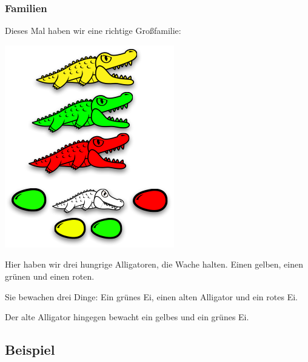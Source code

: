 \documentclass{beamer}
\begin{document}

\begin{frame}
\frametitle{Familien}

Dieses Mal haben wir eine richtige Großfamilie:\pause

\begin{multicols}{2}

\begin{center}
\includegraphics[scale=0.5]{families_3.png} 
\end{center}

\columnbreak
\pause

Hier haben wir drei hungrige Alligatoren, die Wache halten. Einen gelben, einen grünen und einen roten.\pause\bigskip

Sie bewachen drei Dinge: Ein grünes Ei, einen alten Alligator und ein rotes Ei.\pause\bigskip

Der alte Alligator hingegen bewacht ein gelbes und ein grünes Ei. 

\end{multicols}

\end{frame}

\subsection*{Beispiel}
\end{document}
